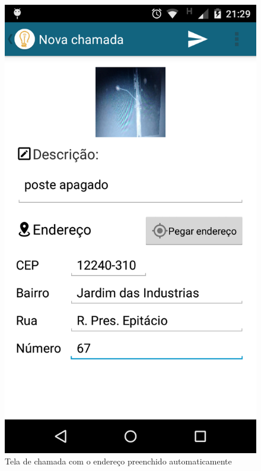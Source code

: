 \documentclass[
	article,			%
	11pt,				%
	oneside,			%
	a4paper,			%
	english,			%
	brazil,				%
	sumario=tradicional
	]{abntex2}
\begin{document}
\clearpage

\begin{figure}[!htbp]
 \centering
  \begin{minipage}{0.4\textwidth}
    \centering
    \caption{\label{android-tela-nova-chamada-endereco}Tela de chamada com o endereço preenchido automaticamente}
    \includegraphics[scale=0.1]{android/5.png}
  \end{minipage}
  \hfill
  \begin{minipage}{0.4\textwidth}

\end{minipage}
\end{figure}
\end{document}

